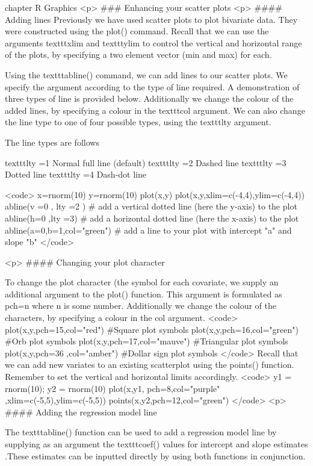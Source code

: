 chapter { R Graphics}
<p>
###  Enhancing your scatter plots
<p>
#### {Adding lines}
Previously we have used scatter plots to plot bivariate data. They were constructed using the plot() command.
Recall that we can use the arguments texttt{xlim} and texttt{ylim} to control the vertical and horizontal range of the plots, by specifying a two element vector (min and max) for each.

Using the texttt{abline()} command, we can add lines to our scatter plots. We specify the argument according to the type of line required. A demonstration of three types of line is provided below.
Additionally we change the colour of the added lines, by specifying a colour in the texttt{col} argument. We can also change the line type to one of four possible types, using the texttt{lty} argument.

The line types are follows

      	texttt{lty =1}   Normal full line (default)
      	texttt{lty =2}   Dashed line
      	texttt{lty =3}   Dotted line
      	texttt{lty =4}   Dash-dot line

 <code>
x=rnorm(10)
y=rnorm(10)
plot(x,y)
plot(x,y,xlim=c(-4,4),ylim=c(-4,4))
abline(v =0 , lty =2 )    # add a vertical dotted line (here the y-axis) to the plot
abline(h=0  ,lty =3)    # add a horizontal dotted line (here the x-axis) to the plot
abline(a=0,b=1,col="green") # add a line to your plot with intercept "a" and slope "b"
 </code>

<p>
#### {Changing your plot character}

To change the plot character (the symbol for each covariate, we supply an additional argument to the plot() function.  This argument is formulated as pch=n where n is some number.
Additionally we change the colour of the characters, by specifying a colour in the col argument.
 <code>
plot(x,y,pch=15,col="red")		#Square plot symbols
plot(x,y,pch=16,col="green")		#Orb plot symbols
plot(x,y,pch=17,col="mauve")		#Triangular plot symbols
plot(x,y,pch=36	,col="amber")		#Dollar sign plot symbols
</code>
Recall that we can add new variates to an existing scatterplot using the points() function. Remember to set the vertical and horizontal limits accordingly.
 <code>
y1 = rnorm(10); y2 = rnorm(10)
plot(x,y1, pch=8,col="purple" ,xlim=c(-5,5),ylim=c(-5,5))
points(x,y2,pch=12,col="green")
</code>
<p>
#### {Adding the regression model line}

The texttt{abline()} function can be used to add a regression model line  by supplying as an argument the texttt{coef()} values for intercept and slope estimates .These estimates can be inputted directly by using both functions in conjunction.

